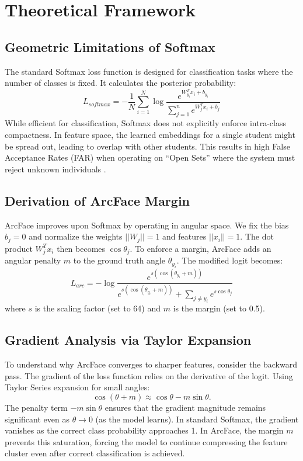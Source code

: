 \documentclass[conference]{IEEEtran}
\begin{document}
\section{Theoretical Framework}

\subsection{Geometric Limitations of Softmax}
The standard Softmax loss function is designed for classification tasks where the number of classes is fixed. It calculates the posterior probability:
\begin{equation}
L_{softmax} = -\frac{1}{N} \sum_{i=1}^{N} \log \frac{e^{W_{y_i}^T x_i + b_{y_i}}}{\sum_{j=1}^{n} e^{W_j^T x_i + b_j}}
\end{equation}
While efficient for classification, Softmax does not explicitly enforce intra-class compactness. In feature space, the learned embeddings for a single student might be spread out, leading to overlap with other students. This results in high False Acceptance Rates (FAR) when operating on ``Open Sets'' where the system must reject unknown individuals \cite{b11}.

\subsection{Derivation of ArcFace Margin}
ArcFace improves upon Softmax by operating in angular space. We fix the bias $b_j = 0$ and normalize the weights $||W_j|| = 1$ and features $||x_i|| = 1$. The dot product $W_j^T x_i$ then becomes $\cos \theta_j$.
To enforce a margin, ArcFace adds an angular penalty $m$ to the ground truth angle $\theta_{y_i}$. The modified logit becomes:
\begin{equation}
L_{arc} = -\log \frac{e^{s(\cos(\theta_{y_i} + m))}}{e^{s(\cos(\theta_{y_i} + m))} + \sum_{j \neq y_i} e^{s \cos \theta_j}}
\end{equation}
where $s$ is the scaling factor (set to 64) and $m$ is the margin (set to 0.5).

\subsection{Gradient Analysis via Taylor Expansion}
To understand why ArcFace converges to sharper features, consider the backward pass. The gradient of the loss function relies on the derivative of the logit. Using Taylor Series expansion for small angles:
\begin{equation}
\cos(\theta + m) \approx \cos \theta - m \sin \theta.
\end{equation}
The penalty term $-m \sin \theta$ ensures that the gradient magnitude remains significant even as $\theta \to 0$ (as the model learns). In standard Softmax, the gradient vanishes as the correct class probability approaches 1. In ArcFace, the margin $m$ prevents this saturation, forcing the model to continue compressing the feature cluster even after correct classification is achieved.
\end{document}
